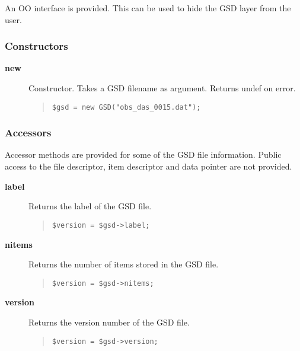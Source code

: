 \documentclass[twoside,11pt]{article}
\newenvironment{myquote}{\begin{quote}\begin{small}}{\end{small}\end{quote}}
\renewcommand{\_}{\texttt{\symbol{95}}}
\begin{document}
An OO interface is provided. This can be used to hide
the GSD layer from the user.

\subsubsection*{Constructors\label{Constructors}}\begin{description}
\item[\textbf{new}] \mbox{}

Constructor. Takes a GSD filename as argument. Returns undef
on error.

\begin{myquote}
\begin{verbatim}
$gsd = new GSD("obs_das_0015.dat");
\end{verbatim}
\end{myquote} %

\end{description}
\subsubsection*{Accessors\label{Accessors}}

Accessor methods are provided for some of the GSD file
information. Public access to the file descriptor, item descriptor
and data pointer are not provided.

\begin{description}
\item[\textbf{label}] \mbox{}

Returns the label of the GSD file.

\begin{myquote}
\begin{verbatim}
$version = $gsd->label;
\end{verbatim}
\end{myquote}

\item[\textbf{nitems}] \mbox{}

Returns the number of items stored in the GSD file.

\begin{myquote}
\begin{verbatim}
$version = $gsd->nitems;
\end{verbatim}
\end{myquote}

\item[\textbf{version}] \mbox{}

Returns the version number of the GSD file.

\begin{myquote}
\begin{verbatim}
$version = $gsd->version;
\end{verbatim}
\end{myquote}


\end{description}
\end{document}
